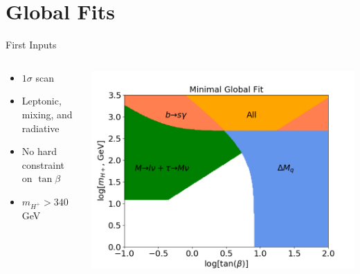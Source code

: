 \documentclass[10pt,xcolor={table,dvipsnames},t]{beamer}
\begin{document}
\section{Global Fits}
\begin{frame}{First Inputs}
    \begin{columns}[T]
        \begin{column}{0.33\textwidth}
            \vspace{1.5em}
            \begin{itemize}
                \item $1\sigma$ scan
                \item Leptonic, mixing, and radiative
                \item No hard constraint on $\tan\beta$
                \item $m_{H^+} > 340\,$GeV
            \end{itemize}
        \end{column}
        \begin{column}{0.60\textwidth}
            \includegraphics[scale=0.35]{global}
        \end{column}
    \end{columns}
\end{frame}
\end{document}
